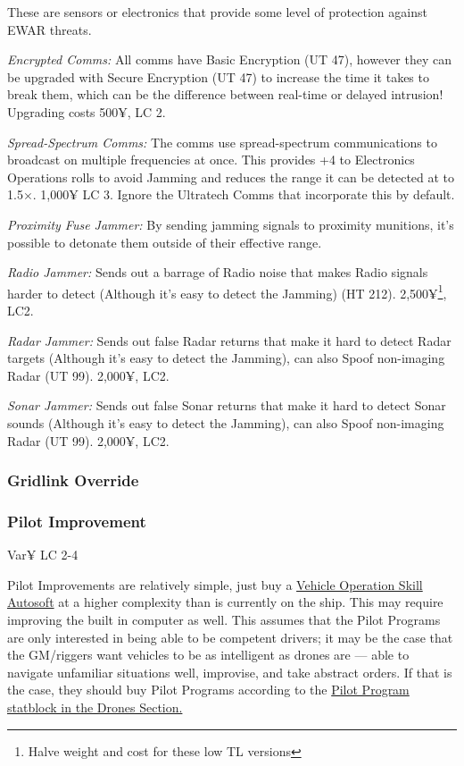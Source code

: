 \begin{multicols*}{2}
	These are sensors or electronics that provide some level of protection against EWAR threats.
	
	\textit{Encrypted Comms:} All comms have Basic Encryption (UT 47), however they can be upgraded with Secure Encryption (UT 47) to increase the time it takes to break them, which can be the difference between real-time or delayed intrusion! Upgrading costs 500¥, LC 2.
	
	\textit{Spread-Spectrum Comms:} The comms use spread-spectrum communications to broadcast on multiple frequencies at once. This provides +4 to Electronics Operations rolls to avoid Jamming and reduces the range it can be detected at to 1.5$\times$. 1,000¥ LC 3. Ignore the Ultratech Comms that incorporate this by default.
		
	\textit{Proximity Fuse Jammer:} By sending jamming signals to proximity munitions, it's possible to detonate them outside of their effective range. %
	
	\textit{Radio Jammer:} Sends out a barrage of Radio noise that makes Radio signals harder to detect (Although it's easy to detect the Jamming) (HT 212). 2,500¥\footnote{Halve weight and cost for these low TL versions}, LC2.
	
	\textit{Radar Jammer:} Sends out false Radar returns that make it hard to detect Radar targets (Although it's easy to detect the Jamming), can also Spoof non-imaging Radar (UT 99). 2,000¥, LC2.
	
	\textit{Sonar Jammer:} Sends out false Sonar returns that make it hard to detect Sonar sounds (Although it's easy to detect the Jamming), can also Spoof non-imaging Radar (UT 99). 2,000¥, LC2.
	
	\subsubsection{Gridlink Override}
	
	\subsubsection{Pilot Improvement}
	Var¥ LC 2-4
	
	Pilot Improvements are relatively simple, just buy a \hyperref[autosofts]{Vehicle Operation Skill Autosoft} at a higher complexity than is currently on the ship. This may require improving the built in computer as well. This assumes that the Pilot Programs are only interested in being able to be competent drivers; it may be the case that the GM/riggers want vehicles to be as intelligent as drones are — able to navigate unfamiliar situations well, improvise, and take abstract orders. If that is the case, they should buy Pilot Programs according to the \hyperref[drones]{Pilot Program statblock in the Drones Section.}
	

\end{multicols*}
